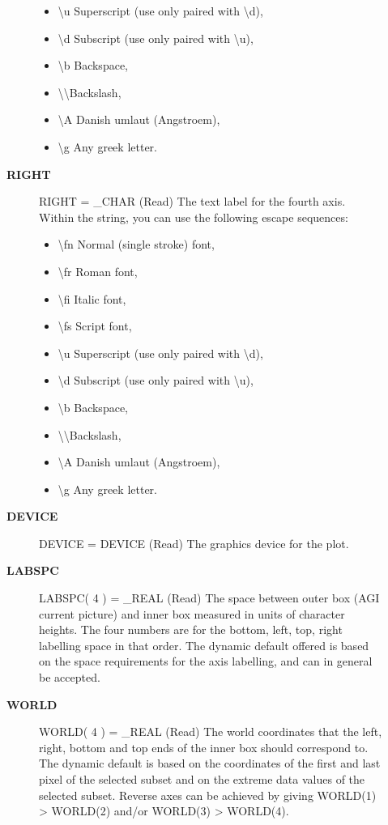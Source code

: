 \begin{description}
\begin{description}
\begin{itemize}
   \item \textbackslash u  Superscript (use only paired with \textbackslash d),
   \item \textbackslash d  Subscript (use only paired with \textbackslash u),
   \item \textbackslash b  Backspace,
   \item \textbackslash \textbackslash   Backslash,
   \item \textbackslash A  Danish umlaut (Angstroem),
   \item \textbackslash g  Any greek letter.
   \end{itemize}
\item [\textbf{RIGHT}]
RIGHT = \_CHAR (Read)
   The text label for the fourth axis. Within the string, you can
   use the following escape sequences:
   \begin{itemize}
   \item \textbackslash fn Normal (single stroke) font,
   \item \textbackslash fr Roman font,
   \item \textbackslash fi Italic font,
   \item \textbackslash fs Script font,
   \item \textbackslash u  Superscript (use only paired with \textbackslash d),
   \item \textbackslash d  Subscript (use only paired with \textbackslash u),
   \item \textbackslash b  Backspace,
   \item \textbackslash \textbackslash   Backslash,
   \item \textbackslash A  Danish umlaut (Angstroem),
   \item \textbackslash g  Any greek letter.
   \end{itemize}
\item [\textbf{DEVICE}]
DEVICE = DEVICE (Read)
   The graphics device for the plot.
\item [\textbf{LABSPC}]
LABSPC( 4 ) = \_REAL (Read)
   The space between outer box (AGI current picture) and inner box
   measured in units of character heights. The four numbers are
   for the bottom, left, top, right labelling space in that order.
   The dynamic default offered is based on the space requirements
   for the axis labelling, and can in general be accepted.
\item [\textbf{WORLD}]
WORLD( 4 ) = \_REAL (Read)
   The world coordinates that the left, right, bottom and top ends
   of the inner box should correspond to.
   The dynamic default is based on the coordinates of the first
   and last pixel of the selected subset and on the extreme data
   values of the selected subset. Reverse axes can be achieved by
   giving WORLD(1) > WORLD(2) and/or WORLD(3) > WORLD(4).


\end{description}
\end{description}
